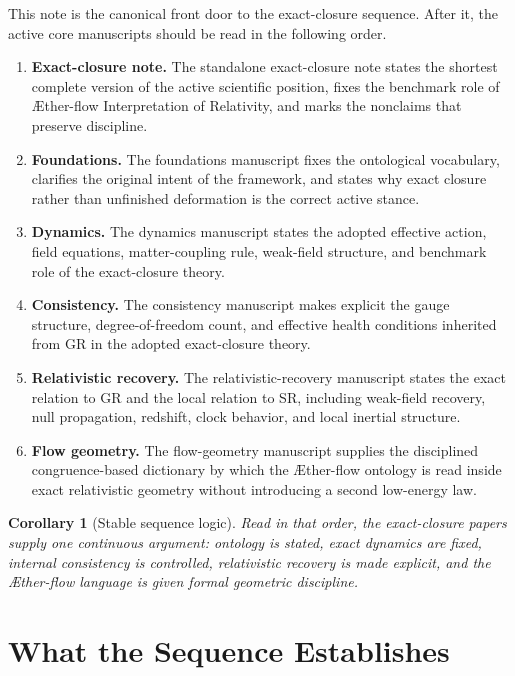 \documentclass[11pt]{article}
\newcommand{\Aflow}{\AE{}ther-flow}
\newcommand{\TheoryName}{\Aflow{} Interpretation of Relativity}
\newtheorem{corollary}{Corollary}
\begin{document}
This note is the canonical front door to the exact-closure sequence. After it, the active core manuscripts should be read in the following order.
\begin{enumerate}
    \item \textbf{Exact-closure note.} The standalone exact-closure note states the shortest complete version of the active scientific position, fixes the benchmark role of \TheoryName{}, and marks the nonclaims that preserve discipline.
    \item \textbf{Foundations.} The foundations manuscript fixes the ontological vocabulary, clarifies the original intent of the framework, and states why exact closure rather than unfinished deformation is the correct active stance.
    \item \textbf{Dynamics.} The dynamics manuscript states the adopted effective action, field equations, matter-coupling rule, weak-field structure, and benchmark role of the exact-closure theory.
    \item \textbf{Consistency.} The consistency manuscript makes explicit the gauge structure, degree-of-freedom count, and effective health conditions inherited from GR in the adopted exact-closure theory.
    \item \textbf{Relativistic recovery.} The relativistic-recovery manuscript states the exact relation to GR and the local relation to SR, including weak-field recovery, null propagation, redshift, clock behavior, and local inertial structure.
    \item \textbf{Flow geometry.} The flow-geometry manuscript supplies the disciplined congruence-based dictionary by which the \Aflow{} ontology is read inside exact relativistic geometry without introducing a second low-energy law.
\end{enumerate}

\begin{corollary}[Stable sequence logic]
Read in that order, the exact-closure papers supply one continuous argument: ontology is stated, exact dynamics are fixed, internal consistency is controlled, relativistic recovery is made explicit, and the \Aflow{} language is given formal geometric discipline.
\end{corollary}

\section{What the Sequence Establishes}
\end{document}
